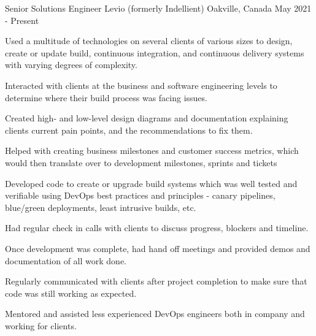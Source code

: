 \textcolor{awesome}{\raisebox{0.1\height}{\faBriefcase\thinspace}}


\begin{cventries}

  \cventry
    {Senior Solutions Engineer} %
    {Levio (formerly Indellient)} %
    {Oakville, Canada} %
    {May 2021 - Present} %
    {
      \begin{cvitems} %
        \item {Used a multitude of technologies on several clients of various sizes to design, create or update build, continuous integration, and continuous delivery systems with varying degrees of complexity.}
        \item {Interacted with clients at the business and software engineering levels to determine where their build process was facing issues.}
        \item {Created high- and low-level design diagrams and documentation explaining clients current pain points, and the recommendations to fix them.}
        \item {Helped with creating business milestones and customer success metrics, which would then translate over to development milestones, sprints and tickets}
        \item {Developed code to create or upgrade build systems which was well tested and verifiable using DevOps best practices and principles - canary pipelines, blue/green deployments, least intrusive builds, etc.}
        \item {Had regular check in calls with clients to discuss progress, blockers and timeline.}
        \item {Once development was complete, had hand off meetings and provided demos and documentation of all work done.}
        \item {Regularly communicated with clients after project completion to make sure that code was still working as expected.}
        \item {Mentored and assisted less experienced DevOps engineers both in company and working for clients.}
      \end{cvitems}
    }


\end{cventries}
